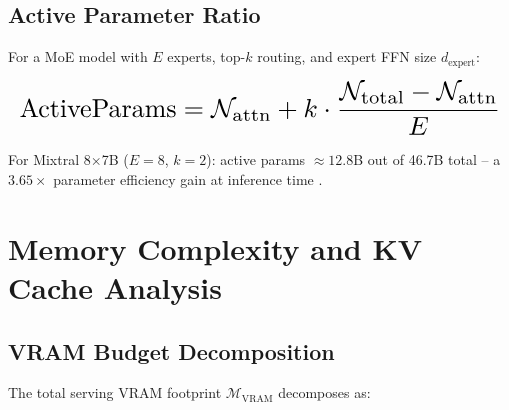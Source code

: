 \documentclass{article}
\begin{document}
\subsection{Active Parameter Ratio}


For a MoE model with $E$ experts, top-$k$ routing, and expert FFN size $d_{\text{expert}}$:















\begin{equation}
\resizebox{\columnwidth}{!}{$\displaystyle
\begin{aligned}
\text{ActiveParams} = \mathcal{N}_{\text{attn}} + k \cdot \frac{\mathcal{N}_{\text{total}} - \mathcal{N}_{\text{attn}}}{E}
\end{aligned}
$}
\end{equation}















For Mixtral 8$\times$7B ($E = 8$, $k = 2$): active params $\approx 12.8$B out of 46.7B total -- a $3.65\times$ parameter efficiency gain at inference time \cite{arxiv_2412_06333}.




\section{Memory Complexity and KV Cache Analysis}



\subsection{VRAM Budget Decomposition}


The total serving VRAM footprint $\mathcal{M}_{\text{VRAM}}$ decomposes as:
\end{document}
